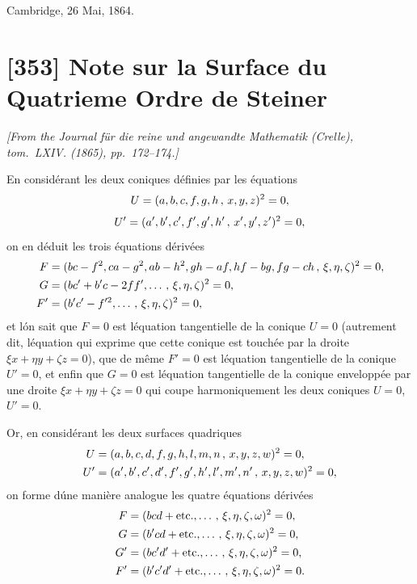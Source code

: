 \documentclass[11pt,a4paper]{article}
\theoremstyle{plain}
\begin{document}
\begin{flushright}
Cambridge, 26 Mai, 1864.
\end{flushright}


\newpage
\section*{[353] Note sur la Surface du Quatrieme Ordre de Steiner}

\begin{flushright}
\textit{[From the Journal f\"ur die reine und angewandte Mathematik (Crelle),\\
tom.~LXIV. (1865), pp.~172--174.]}
\end{flushright}

En consid\'erant les deux coniques d\'efinies par les \'equations
\[
U = (a, b, c, f, g, h \, \char`\,\, x, y, z)^2 = 0,
\]
\[
U' = (a', b', c', f', g', h' \, \char`\,\, x', y', z')^2 = 0,
\]
on en d\'eduit les trois \'equations d\'eriv\'ees
\begin{align*}
F &= (bc-f^2, ca-g^2, ab-h^2, gh-af, hf-bg, fg-ch \, \char`\,\, \xi, \eta, \zeta)^2 = 0,\\
G &= (bc'+b'c-2ff', \ldots \, \char`\,\, \xi, \eta, \zeta)^2 = 0,\\
F' &= (b'c'-f'^2, \ldots \, \char`\,\, \xi, \eta, \zeta)^2 = 0,
\end{align*}
et l\'on sait que $F=0$ est l\'equation tangentielle de la conique $U=0$ (autrement dit, l\'equation qui exprime que cette conique est touch\'ee par la droite $\xi x + \eta y + \zeta z = 0$), que de m\^eme $F'=0$ est l\'equation tangentielle de la conique $U'=0$, et enfin que $G=0$ est l\'equation tangentielle de la conique envelopp\'ee par une droite $\xi x + \eta y + \zeta z = 0$ qui coupe harmoniquement les deux coniques $U=0$, $U'=0$.

Or, en consid\'erant les deux surfaces quadriques
\begin{align*}
U &= (a, b, c, d, f, g, h, l, m, n \, \char`\,\, x, y, z, w)^2 = 0,\\
U' &= (a', b', c', d', f', g', h', l', m', n' \, \char`\,\, x, y, z, w)^2 = 0,
\end{align*}
on forme d\'une mani\`ere analogue les quatre \'equations d\'eriv\'ees
\begin{align*}
F &= (bcd+\text{etc.}, \ldots \, \char`\,\, \xi, \eta, \zeta, \omega)^2 = 0,\\
G &= (b'cd+\text{etc.}, \ldots \, \char`\,\, \xi, \eta, \zeta, \omega)^2 = 0,\\
G' &= (bc'd'+\text{etc.}, \ldots \, \char`\,\, \xi, \eta, \zeta, \omega)^2 = 0,\\
F' &= (b'c'd'+\text{etc.}, \ldots \, \char`\,\, \xi, \eta, \zeta, \omega)^2 = 0.
\end{align*}
\end{document}
